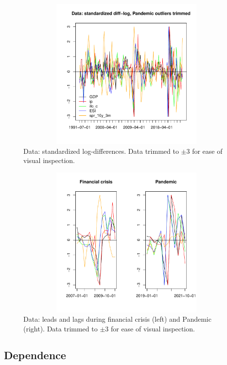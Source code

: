 \documentclass[a4paper]{article}
\begin{document}
\begin{figure}[H]\begin{center}\includegraphics[height=3in, width=4.5in]{./Figures/Data.pdf}\caption{Data: standardized log-differences. Data trimmed to $\pm 3$ for ease of visual inspection.\label{data}}\end{center}\end{figure}
\begin{figure}[H]\begin{center}\includegraphics[height=3in, width=4.5in]{./Figures/data_lags.pdf}\caption{Data: leads and lags during financial crisis (left) and Pandemic (right). Data trimmed to $\pm 3$ for ease of visual inspection.\label{data_lags}}\end{center}\end{figure}




\subsection{Dependence}
\end{document}
